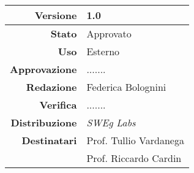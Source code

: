\begin{center}
\begin{tabular}{r|l}
    \textbf{Versione} & 1.0 \\
    \hline
    \textbf{Stato} & Approvato \\
    \hline
    \textbf{Uso} & Esterno \\
    \hline
    \textbf{Approvazione} & ....... \\
    \hline
    \textbf{Redazione} & Federica Bolognini \\
    \hline
    \textbf{Verifica} & ....... \\
    \hline
    \textbf{Distribuzione} & \emph{SWEg Labs} \\
    \hline
    \textbf{Destinatari} & Prof. Tullio Vardanega \\
                         & Prof. Riccardo Cardin \\
\end{tabular}
\end{center}
